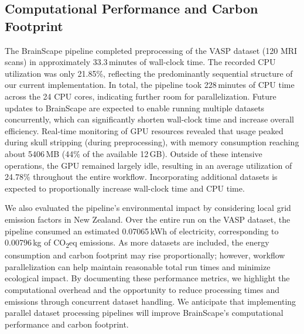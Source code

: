 \subsection{Computational Performance and Carbon Footprint}

The BrainScape pipeline completed preprocessing of the VASP dataset (120 MRI scans) in approximately 33.3\,minutes of wall-clock time. 
The recorded CPU utilization was only 21.85\%, reflecting the predominantly sequential structure of our current implementation. 
In total, the pipeline took 228\,minutes of CPU time across the 24 CPU cores, indicating further room for parallelization. 
Future updates to BrainScape are expected to enable running multiple datasets concurrently, 
which can significantly shorten wall-clock time and increase overall efficiency.
Real-time monitoring of GPU resources revealed that usage peaked during skull stripping (during preprocessing), 
with memory consumption reaching about 5406\,MB (44\% of the available 12\,GB). 
Outside of these intensive operations, the GPU remained largely idle, resulting in an average utilization 
of 24.78\% throughout the entire workflow. 
Incorporating additional datasets is expected to proportionally increase wall-clock time and CPU time.

We also evaluated the pipeline's environmental impact by considering local grid emission factors in New Zealand. 
Over the entire run on the VASP dataset, the pipeline consumed an estimated 0.07065\,kWh of electricity, corresponding to 
0.00796\,kg of CO\textsubscript{2}eq emissions. As more datasets are included, the energy consumption and 
carbon footprint may rise proportionally; however, workflow parallelization can help maintain 
reasonable total run times and minimize ecological impact. By documenting these performance metrics, we highlight 
the computational overhead and the opportunity to reduce processing times and emissions through concurrent dataset handling. 
We anticipate that implementing parallel dataset processing pipelines will improve BrainScape's computational performance and carbon footprint.


